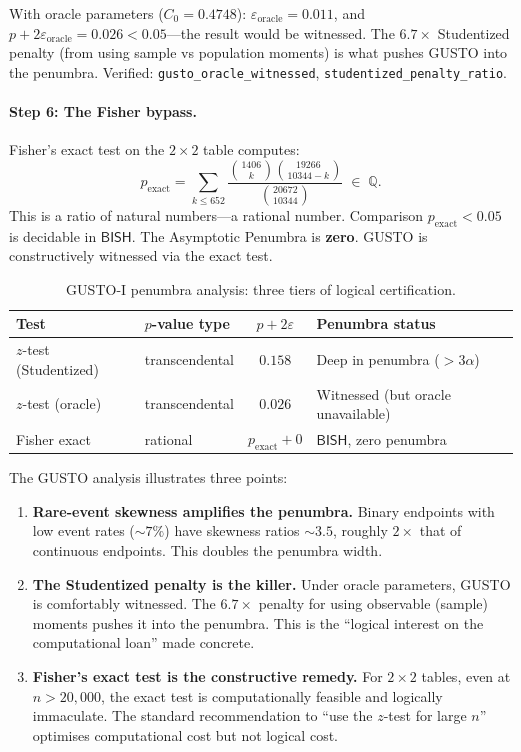 \documentclass[11pt,a4paper]{article}
\theoremstyle{plain}
\theoremstyle{definition}
\newcommand{\BISH}{\textsf{BISH}}
\newcommand{\Q}{\mathbb{Q}}
\begin{document}
With oracle parameters ($C_0 = 0.4748$): $\varepsilon_{\mathrm{oracle}} = 0.011$, and $p + 2\varepsilon_{\mathrm{oracle}} = 0.026 < 0.05$---the result would be witnessed.  The $6.7\times$ Studentized penalty (from using sample vs population moments) is what pushes GUSTO into the penumbra.  Verified: \texttt{gusto\_oracle\_witnessed}, \texttt{studentized\_penalty\_ratio}.

\paragraph{Step 6: The Fisher bypass.}  Fisher's exact test on the $2 \times 2$ table computes:
\[
  p_{\mathrm{exact}} = \sum_{k \leq 652} \frac{\binom{1406}{k}\binom{19266}{10344-k}}{\binom{20672}{10344}} \;\in\; \Q.
\]
This is a ratio of natural numbers---a rational number.  Comparison $p_{\mathrm{exact}} < 0.05$ is decidable in $\BISH$.  The Asymptotic Penumbra is \textbf{zero}.  GUSTO is constructively witnessed via the exact test.

\begin{table}[ht]
\centering
\caption{GUSTO-I penumbra analysis: three tiers of logical certification.}
\label{tab:gusto}
\begin{tabular}{@{}llcl@{}}
\toprule
\textbf{Test} & \textbf{$p$-value type} & $p + 2\varepsilon$ & \textbf{Penumbra status} \\
\midrule
$z$-test (Studentized) & transcendental & $0.158$ & Deep in penumbra ($> 3\alpha$) \\
$z$-test (oracle)      & transcendental & $0.026$ & Witnessed (but oracle unavailable) \\
Fisher exact           & rational       & $p_{\mathrm{exact}} + 0$ & $\BISH$, zero penumbra \\
\bottomrule
\end{tabular}
\end{table}

\noindent The GUSTO analysis illustrates three points:
\begin{enumerate}[nosep]
\item \textbf{Rare-event skewness amplifies the penumbra.}  Binary endpoints with low event rates ($\sim 7\%$) have skewness ratios $\sim 3.5$, roughly $2\times$ that of continuous endpoints.  This doubles the penumbra width.
\item \textbf{The Studentized penalty is the killer.}  Under oracle parameters, GUSTO is comfortably witnessed.  The $6.7\times$ penalty for using observable (sample) moments pushes it into the penumbra.  This is the ``logical interest on the computational loan'' made concrete.
\item \textbf{Fisher's exact test is the constructive remedy.}  For $2 \times 2$ tables, even at $n > 20{,}000$, the exact test is computationally feasible and logically immaculate.  The standard recommendation to ``use the $z$-test for large $n$'' optimises computational cost but not logical cost.
\end{enumerate}
\end{document}
